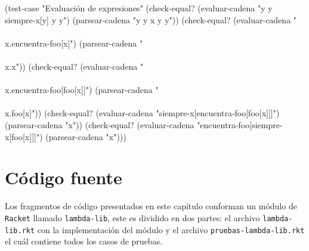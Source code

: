 \documentclass[10pt,oneside,openany,letterpaper]{book}
\begin{document}
(test-case "Evaluación de expresiones"
           (check-equal? (evaluar-cadena "y y siempre-x[y] y y")
                         (parsear-cadena "y y x y y"))
           (check-equal? (evaluar-cadena "\\\\x.encuentra-foo[x]")
                         (parsear-cadena "\\\\x.x"))
           (check-equal? (evaluar-cadena "\\\\x.encuentra-foo[foo[x]]")
                         (parsear-cadena "\\\\x.foo[x]"))
           (check-equal? (evaluar-cadena "siempre-x[encuentra-foo[foo[x]]]")
                         (parsear-cadena "x"))
           (check-equal? (evaluar-cadena "encuentra-foo[siempre-x[foo[x]]]")
                         (parsear-cadena "x")))
\nwendcode{}\nwdocspar

\section{Código fuente}

Los fragmentos de código presentados en este capítulo conforman un módulo de {\tt{}Racket} llamado {\tt{}lambda-lib}, este es dividido en dos partes: el archivo {\tt{}lambda-lib.rkt} con la implementación del módulo y el archivo {\tt{}pruebas-lambda-lib.rkt} el cuál contiene todos los casos de pruebas.
\end{document}
